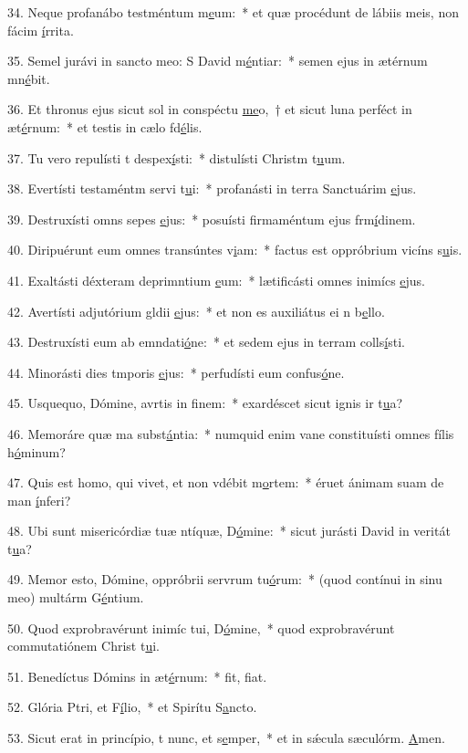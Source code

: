 34. Neque profanábo testméntum m\uline{e}um:~* et quæ procédunt de lábiis meis, non fácim \uline{í}rrita.\par 
35. Semel jurávi in sancto meo: S David m\uline{é}ntiar:~* semen ejus in ætérnum mn\uline{é}bit.\par 
36. Et thronus ejus sicut sol in conspéctu \uline{me}o,~† et sicut luna perféct in æt\uline{é}rnum:~* et testis in cælo fd\uline{é}lis.\par 
37. Tu vero repulísti t despex\uline{í}sti:~* distulísti Christm t\uline{u}um.\par 
38. Evertísti testaméntm servi t\uline{u}i:~* profanásti in terra Sanctuárim \uline{e}jus.\par 
39. Destruxísti omns sepes \uline{e}jus:~* posuísti firmaméntum ejus frm\uline{í}dinem.\par 
40. Diripuérunt eum omnes transúntes v\uline{i}am:~* factus est oppróbrium vicíns s\uline{u}is.\par 
41. Exaltásti déxteram deprimntium \uline{e}um:~* lætificásti omnes inimícs \uline{e}jus.\par 
42. Avertísti adjutórium gldii \uline{e}jus:~* et non es auxiliátus ei n b\uline{e}llo.\par 
43. Destruxísti eum ab emndati\uline{ó}ne:~* et sedem ejus in terram colls\uline{í}sti.\par 
44. Minorásti dies tmporis \uline{e}jus:~* perfudísti eum confus\uline{ó}ne.\par 
45. Usquequo, Dómine, avrtis in f\uline{i}nem:~* exardéscet sicut ignis ir t\uline{u}a?\par 
46. Memoráre quæ ma subst\uline{á}ntia:~* numquid enim vane constituísti omnes fílis h\uline{ó}minum?\par 
47. Quis est homo, qui vivet, et non vdébit m\uline{o}rtem:~* éruet ánimam suam de man \uline{í}nferi?\par 
48. Ubi sunt misericórdiæ tuæ ntíquæ, D\uline{ó}mine:~* sicut jurásti David in veritát t\uline{u}a?\par 
49. Memor esto, Dómine, oppróbrii servrum tu\uline{ó}rum:~* (quod contínui in sinu meo) multárm G\uline{é}ntium.\par 
50. Quod exprobravérunt inimíc tui, D\uline{ó}mine,~* quod exprobravérunt commutatiónem Christ t\uline{u}i.\par 
51. Benedíctus Dómins in æt\uline{é}rnum:~* fit, f\uline{i}at.\par 
52. Glória Ptri, et F\uline{í}lio,~* et Spirítu S\uline{a}ncto.\par 
53. Sicut erat in princípio, t nunc, et s\uline{e}mper,~* et in sǽcula sæculórm. \uline{A}men.\par 
